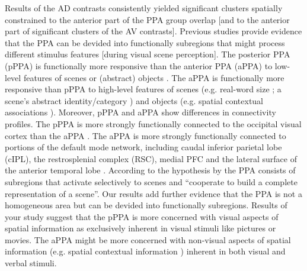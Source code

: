 \documentclass[english]{article}
\begin{document}
Results of the AD contrasts consistently yielded significant clusters spatially
constrained to the anterior part of the PPA group overlap [and to the anterior
part of significant clusters of the AV contrasts].
Previous studies provide evidence that the PPA can be devided into functionally
subregions that might process different stimulus features [during visual scene
perception].
The posterior PPA (pPPA) is functionally more responsive than the anterior PPA
(aPPA) to low-level features of scenes or (abstract) objects
\citep{baldassano2013differential, nasr2014thinking,
rajimehr2011parahippocampal}.
The aPPA is functionally more responsive than pPPA to high-level features of
scenes (e.g. real-word size \citep{park2015parametric}; a scene's abstract
identity/category \citep{marchette2015outside, watson2016patterns}) and objects
(e.g. spatial contextual associations \citep{aminoff2007parahippocampal,
aminoff2013role}).
Moreover, pPPA and aPPA show differences in connectivity profiles.
The pPPA is more strongly functionally connected to the occipital visual cortex
than the aPPA \citep{baldassano2013differential, baldassano2016two}.
The aPPA is more strongly functionally connected to portions of the default mode
network, including caudal inferior parietal lobe (cIPL), the restrosplenial
complex (RSC), medial PFC and the lateral surface of the anterior temporal lobe
\citep{baldassano2013differential, baldassano2016two}.
According to the hypothesis by \citep{baldassano2013differential} the PPA
consists of subregions that activate selectively to scenes and ``cooperate to
build a complete representation of a scene''.
Our results add further evidence that the PPA is not a homogeneous area but can
be devided into functionally subregions.
Results of your study suggest that the pPPA is more concerned with visual
aspects of spatial information as exclusively inherent in visual stimuli like
pictures or movies.
The aPPA might be more concerned with non-visual aspects of spatial information
(e.g. spatial contextual information \citep{aminoff2013role,
aminoff2015associative, baumann2016functional}) inherent in both visual and
verbal stimuli.
\end{document}
